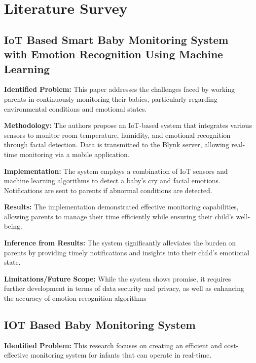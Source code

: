 \documentclass[12pt,a4paper]{report}
\begin{document}

\chapter{Literature Survey}

\section{IoT Based Smart Baby Monitoring System with Emotion Recognition Using Machine Learning}

\textbf{Identified Problem: }This paper addresses the challenges faced by working parents in continuously monitoring their babies, particularly regarding environmental conditions and emotional states\cite{alam2023iot}.
\setlength{\parskip}{1em}  %

\noindent\textbf{Methodology:} The authors propose an IoT-based system that integrates various sensors to monitor room temperature, humidity, and emotional recognition through facial detection. Data is transmitted to the Blynk server, allowing real-time monitoring via a mobile application.
\setlength{\parskip}{1em}  %

\noindent\textbf{Implementation:} The system employs a combination of IoT sensors and machine learning algorithms to detect a baby's cry and facial emotions. Notifications are sent to parents if abnormal conditions are detected.
\setlength{\parskip}{1em}  %

\noindent\textbf{Results:} The implementation demonstrated effective monitoring capabilities, allowing parents to manage their time efficiently while ensuring their child's well-being.
\setlength{\parskip}{1em}  %

\noindent\textbf{Inference from Results:} The system significantly alleviates the burden on parents by providing timely notifications and insights into their child's emotional state.
\setlength{\parskip}{1em}  %

\noindent\textbf{Limitations/Future Scope:} While the system shows promise, it requires further development in terms of data security and privacy, as well as enhancing the accuracy of emotion recognition algorithms
\setlength{\parskip}{1em}  %

\section{IOT Based Baby Monitoring System}
\textbf{Identified Problem: } This research focuses on creating an efficient and cost-effective monitoring system for infants that can operate in real-time\cite{Singh2021}.
\end{document}
